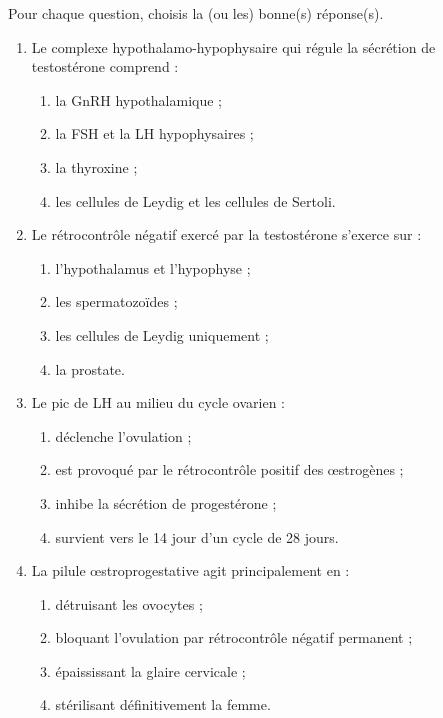 \documentclass[11pt]{article}
\begin{document}
\begin{exercice}
Pour chaque question, choisis la (ou les) bonne(s) réponse(s).
\begin{enumerate}
\item Le complexe hypothalamo-hypophysaire qui régule la sécrétion de testostérone comprend :
\begin{enumerate}
\item la GnRH hypothalamique ;
\item la FSH et la LH hypophysaires ;
\item la thyroxine ;
\item les cellules de Leydig et les cellules de Sertoli.
\end{enumerate}
\item Le rétrocontrôle négatif exercé par la testostérone s'exerce sur :
\begin{enumerate}
\item l'hypothalamus et l'hypophyse ;
\item les spermatozoïdes ;
\item les cellules de Leydig uniquement ;
\item la prostate.
\end{enumerate}
\item Le pic de LH au milieu du cycle ovarien :
\begin{enumerate}
\item déclenche l'ovulation ;
\item est provoqué par le rétrocontrôle positif des œstrogènes ;
\item inhibe la sécrétion de progestérone ;
\item survient vers le 14\ieme{} jour d'un cycle de 28 jours.
\end{enumerate}
\item La pilule œstroprogestative agit principalement en :
\begin{enumerate}
\item détruisant les ovocytes ;
\item bloquant l'ovulation par rétrocontrôle négatif permanent ;
\item épaississant la glaire cervicale ;
\item stérilisant définitivement la femme.
\end{enumerate}
\end{enumerate}
\end{exercice}
\end{document}

